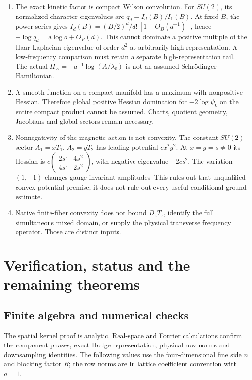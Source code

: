 \documentclass[11pt,letterpaper]{article}
\numberwithin{equation}{section}
\theoremstyle{definition}\newtheorem{definition}[theorem]{Definition}
\theoremstyle{remark}\newtheorem{remark}[theorem]{Remark}
\begin{document}
\begin{enumerate}
\item The exact kinetic factor is compact Wilson convolution. For $SU(2)$, its normalized character eigenvalues are $q_d=I_d(B)/I_1(B)$. At fixed $B$, the power series gives
$I_d(B)=(B/2)^d/d!\,[1+O_B(d^{-1})]$, hence $-\log q_d=d\log d+O_B(d)$. This cannot dominate a positive multiple of the Haar-Laplacian eigenvalue of order $d^2$ at arbitrarily high representation. A low-frequency comparison must retain a separate high-representation tail. The actual $H_A=-a^{-1}\log(A/\lambda_0)$ is not an assumed Schr\"odinger Hamiltonian.
\item A smooth function on a compact manifold has a maximum with nonpositive Hessian. Therefore global positive Hessian domination for $-2\log\psi_0$ on the entire compact product cannot be assumed. Charts, quotient geometry, Jacobians and global sectors remain necessary.
\item Nonnegativity of the magnetic action is not convexity. The constant $SU(2)$ sector $A_1=xT_1$, $A_2=yT_2$ has leading potential $c x^2y^2$. At $x=y=s\ne0$ its Hessian is $c\left(\begin{smallmatrix}2s^2&4s^2\\4s^2&2s^2\end{smallmatrix}\right)$, with negative eigenvalue $-2cs^2$. The variation $(1,-1)$ changes gauge-invariant amplitudes. This rules out that unqualified convex-potential premise; it does not rule out every useful conditional-ground estimate.
\item Native finite-fiber convexity does not bound $D_zT_z$, identify the full simultaneous mixed domain, or supply the physical transverse frequency operator. Those are distinct inputs.
\end{enumerate}

\section{Verification, status and the remaining theorems}
\label{sec:status}

\subsection{Finite algebra and numerical checks}

The spatial kernel proof is analytic. Real-space and Fourier calculations confirm the component phases, exact Hodge representation, physical row norms and downsampling identities. The following values use the four-dimensional fine side $n$ and blocking factor $B$; the row norms are in lattice coefficient convention with $a=1$.
\end{document}
